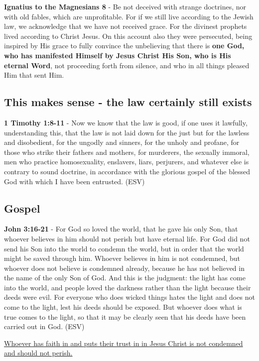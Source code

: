 \documentclass[11pt]{article}
\begin{document}
\textbf{Ignatius to the Magnesians 8} - Be not deceived with strange doctrines, nor with old fables, which are unprofitable. For if we still live according to the Jewish law, we acknowledge that we have not received grace. For the divinest prophets lived according to Christ Jesus. On this account also they were persecuted, being inspired by His grace to fully convince the unbelieving that there is \textbf{one God, who has manifested Himself by Jesus Christ His Son, who is His eternal Word}, not proceeding forth from silence, and who in all things pleased Him that sent Him.

\subsection{This makes sense - the law certainly still exists}
\label{sec:org4a5001a}
\textbf{1 Timothy 1:8-11} -  Now we know that the law is good, if one uses it lawfully, understanding this, that the law is not laid down for the just but for the lawless and disobedient, for the ungodly and sinners, for the unholy and profane, for those who strike their fathers and mothers, for murderers, the sexually immoral, men who practice homosexuality, enslavers, liars, perjurers, and whatever else is contrary to sound doctrine, in accordance with the glorious gospel of the blessed God with which I have been entrusted.  (ESV)

\subsection{Gospel}
\label{sec:org5bdddc6}
\textbf{John 3:16-21} - For God so loved the world, that he gave his only Son, that whoever believes in him should not perish but have eternal life. For God did not send his Son into the world to condemn the world, but in order that the world might be saved through him. Whoever believes in him is not condemned, but whoever does not believe is condemned already, because he has not believed in the name of the only Son of God. And this is the judgment: the light has come into the world, and people loved the darkness rather than the light because their deeds were evil. For everyone who does wicked things hates the light and does not come to the light, lest his deeds should be exposed. But whoever does what is true comes to the light, so that it may be clearly seen that his deeds have been carried out in God. (ESV)

\uline{Whoever has faith in and puts their trust in in Jesus Christ is not condemned and should not perish.}
\end{document}
